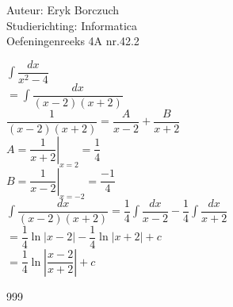 \documentclass[a4paper]{article}
\begin{document}
  
\noindent \large Auteur: Eryk Borczuch \\
\noindent \large Studierichting: Informatica\\
\noindent \large Oefeningenreeks 4A nr.42.2\\

\medskip

\normalsize

$\displaystyle \int \dfrac{dx}{x^2-4}$\\

$\displaystyle =\int \dfrac{dx}{(x-2)(x+2)}$\\

$\dfrac{1}{(x-2)(x+2)} = \dfrac{A}{x-2} + \dfrac{B}{x+2}$\\


$\displaystyle A=\left.\dfrac{1}{x+2}\right|_{x=2}=\dfrac{1}{4}$\\

$\displaystyle B =\left.\dfrac{1}{x-2}\right|_{x=-2}=\dfrac{-1}{4}$\\


$\displaystyle \int \dfrac{dx}{(x-2)(x+2)} = \dfrac{1}{4} \int \dfrac{dx}{x-2} - \dfrac{1}{4} \int \dfrac{dx}{x+2}$\\

$= \dfrac{1}{4} \ln |x-2| - \dfrac{1}{4} \ln |x+2| +c$\\

$= \dfrac{1}{4} \ln \left|\dfrac{x-2}{x+2}\right| +c$

\begin{thebibliography}{999}
\end{thebibliography}
\end{document}
